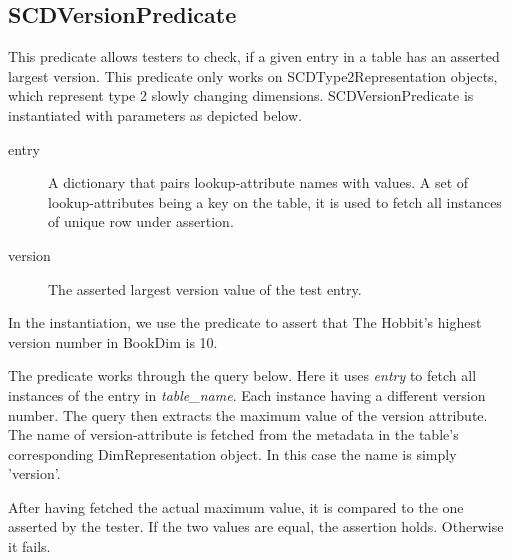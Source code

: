 \subsection{SCDVersionPredicate}\label{SCD}
This predicate allows testers to check, if a given entry in a table has an asserted largest version. This predicate only works on SCDType2Representation objects, which represent type 2 slowly changing dimensions. SCDVersionPredicate is instantiated with parameters as depicted below.


\begin{description}
\item [entry] A dictionary that pairs lookup-attribute names with values. A set of lookup-attributes being a key on the table, it is used to fetch all instances of unique row under assertion. 
\item [version] The asserted largest version value of the test entry.
\end{description}

In the instantiation, we use the predicate to assert that The Hobbit's highest version number in BookDim is 10.

The predicate works through the query below. Here it uses \textit{entry} to fetch all instances of the entry in \textit{table\_name}. Each instance having a different version number. The query then extracts the maximum value of the version attribute.  The name of version-attribute is fetched from the  metadata in the table's corresponding DimRepresentation object. In this case the name is simply 'version'.


After having fetched the actual maximum value, it is compared to the one asserted by the tester. If  the two values are equal, the assertion holds. Otherwise it fails.